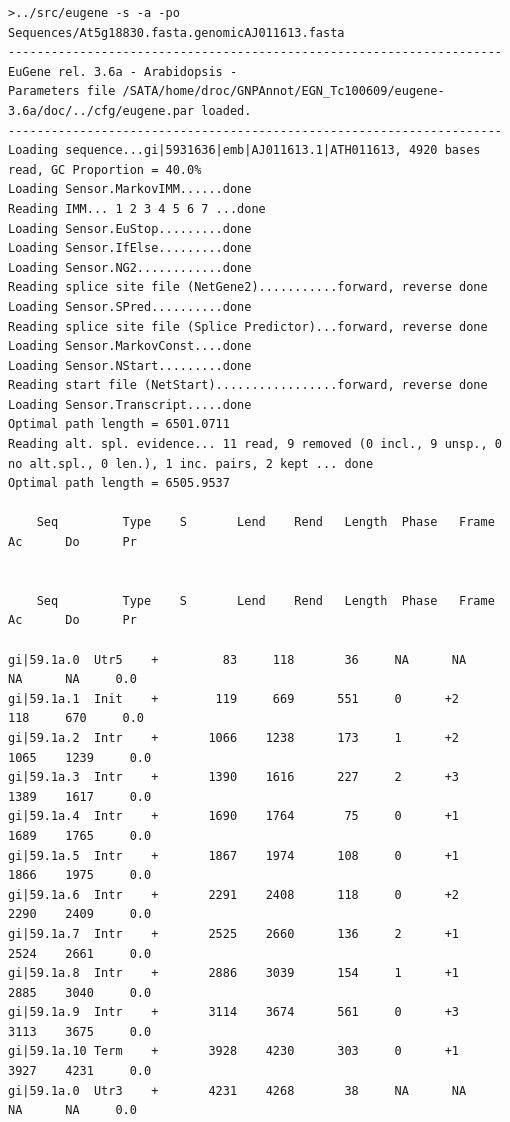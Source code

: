 \documentclass[a4paper,titlepage]{report}
\begin{document}
\begin{Verbatim}[fontsize=\scriptsize]
>../src/eugene -s -a -po Sequences/At5g18830.fasta.genomicAJ011613.fasta
---------------------------------------------------------------------
EuGene rel. 3.6a - Arabidopsis -
Parameters file /SATA/home/droc/GNPAnnot/EGN_Tc100609/eugene-3.6a/doc/../cfg/eugene.par loaded.
---------------------------------------------------------------------
Loading sequence...gi|5931636|emb|AJ011613.1|ATH011613, 4920 bases read, GC Proportion = 40.0%
Loading Sensor.MarkovIMM......done
Reading IMM... 1 2 3 4 5 6 7 ...done
Loading Sensor.EuStop.........done
Loading Sensor.IfElse.........done
Loading Sensor.NG2............done
Reading splice site file (NetGene2)...........forward, reverse done
Loading Sensor.SPred..........done
Reading splice site file (Splice Predictor)...forward, reverse done
Loading Sensor.MarkovConst....done
Loading Sensor.NStart.........done
Reading start file (NetStart).................forward, reverse done
Loading Sensor.Transcript.....done
Optimal path length = 6501.0711
Reading alt. spl. evidence... 11 read, 9 removed (0 incl., 9 unsp., 0 no alt.spl., 0 len.), 1 inc. pairs, 2 kept ... done
Optimal path length = 6505.9537

    Seq         Type    S       Lend    Rend   Length  Phase   Frame      Ac      Do      Pr


    Seq         Type    S       Lend    Rend   Length  Phase   Frame      Ac      Do      Pr

gi|59.1a.0	Utr5    +         83     118       36     NA      NA      NA      NA     0.0  
gi|59.1a.1	Init    +        119     669      551     0      +2     118     670     0.0  
gi|59.1a.2	Intr    +       1066    1238      173     1      +2    1065    1239     0.0  
gi|59.1a.3	Intr    +       1390    1616      227     2      +3    1389    1617     0.0  
gi|59.1a.4	Intr    +       1690    1764       75     0      +1    1689    1765     0.0  
gi|59.1a.5	Intr    +       1867    1974      108     0      +1    1866    1975     0.0  
gi|59.1a.6	Intr    +       2291    2408      118     0      +2    2290    2409     0.0  
gi|59.1a.7	Intr    +       2525    2660      136     2      +1    2524    2661     0.0  
gi|59.1a.8	Intr    +       2886    3039      154     1      +1    2885    3040     0.0  
gi|59.1a.9	Intr    +       3114    3674      561     0      +3    3113    3675     0.0  
gi|59.1a.10	Term    +       3928    4230      303     0      +1    3927    4231     0.0  
gi|59.1a.0	Utr3    +       4231    4268       38     NA      NA      NA      NA     0.0  


\end{Verbatim}
\end{document}
